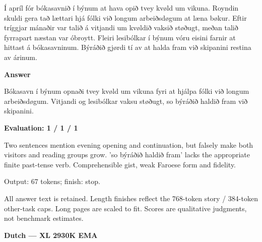 \documentclass[10pt]{article}
\begin{document}
{\begin{minipage}{\textwidth}
Í apríl fór bókasavnið í býnum at hava opið tvey kvøld um vikuna. Royndin skuldi gera tað lættari hjá fólki við longum arbeiðsdøgum at læna bøkur. Eftir tríggjar mánaðir var talið á vitjandi um kvøldið vaksið støðugt, meðan talið fyrrapart næstan var óbroytt. Fleiri lesibólkar í býnum vóru eisini farnir at hittast á bókasavninum. Býráðið gjørdi tí av at halda fram við skipanini restina av árinum.\par\smallskip
\textbf{Answer}\par Bókasavn í býnum opnaði tvey kvøld um vikuna fyri at hjálpa fólki við longum arbeiðsdøgum. Vitjandi og lesibólkar vaksu støðugt, so býráðið haldið fram við skipanini.\par\smallskip
\textbf{Evaluation: 1 / 1 / 1}\par Two sentences mention evening opening and continuation, but falsely make both visitors and reading groups grow. 'so býráðið haldið fram' lacks the appropriate finite past-tense verb. Comprehensible gist, weak Faroese form and fidelity.
\par {\color{gray} Output: 67 tokens; finish: stop.}\par
\medskip\footnotesize All answer text is retained. Length finishes reflect the 768-token story / 384-token other-task caps. Long pages are scaled to fit. Scores are qualitative judgments, not benchmark estimates.
\end{minipage}}%
\noindent\ifdim\dimexpr\ht\languagepage+\dp\languagepage\relax>0.93\textheight%
\resizebox*{!}{0.93\textheight}{\usebox{\languagepage}}%
\else\usebox{\languagepage}\fi%
\clearpage
{\Large\bfseries Dutch --- XL 2930K EMA}\par\smallskip
\end{document}
